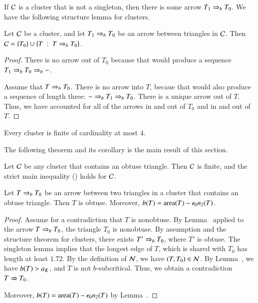 If $\mathcal C$ is a cluster that is not a singleton, then there is
some arrow $T_1\Rightarrow_{b} T_0$.  We have the following structure
lemma for clusters.

\begin{lemma}
  Let $\mathcal C$ be a cluster, and let $T_1\Rightarrow_{b} T_0$ be an
  arrow between triangles in $\mathcal C$.
  Then $\mathcal C = \{T_0\}\cup \{T \ :\  T\Rightarrow_{b} T_0\}$.
\end{lemma}

\begin{proof}  There is no arrow out of $T_0$ because that
would produce a sequence $T_1\Rightarrow_{b} T_0\Rightarrow_{b} -$.  

Assume that $T\Rightarrow_{b} T_0$.  There is
no arrow into $T$,  becaue that would also produce a sequence
of length three: $- \Rightarrow_{b} T_1 \Rightarrow_{b} T_0$.  There is a unique arrow out of $T$.
Thus, we have accounted for all of the arrows in and out of $T_0$ and in and
out of $T$.
\end{proof}

\begin{corollary}
  Every cluster is finite of cardinality at most $4$.
\end{corollary}


The following theorem and its corollary is the main result of this
section.  

\begin{theorem}  
  Let $\mathcal C$ be any cluster that contains an obtuse triangle.  Then
  $\mathcal C$ is finite, and the strict main inequality
  () holds for $\mathcal C$.
\end{theorem}

\begin{lemma} Let $T\Rightarrow_{b} T_0$ be an arrow between two triangles in
a cluster that contains an obtuse triangle.  Then $T$ is obtuse.
Moreover, $b(T) = {\operatorname{area}}(T) -\epsilon_0 n_2(T)$.
\end{lemma}

\begin{proof} Assume for a contradiction that $T$ is nonobtuse.  By Lemma~
applied to the arrow $T\Rightarrow_{b} T_0$, the triangle $T_0$ is nonobtuse.  By assumption and the structure
theorem for clusters, there exists
$T'\Rightarrow_{b} T_0$, where $T'$ is obtuse.
The singleton lemma implies that the longest edge of $T$, which is shared with $T_0$ has length
at least $1.72$.  By the definition of $\mathcal N$, we have $(T,T_0)\in\mathcal N$.   By Lemma~, we
have $b(T)>a_K$, and $T$ is not $b$-subcritical.  Thus, we obtain a contradiction $T\nRightarrow T_0$.

Moreover, $b(T) = {\operatorname{area}}(T) -\epsilon_0 n_2(T)$ by Lemma~.
\end{proof}

